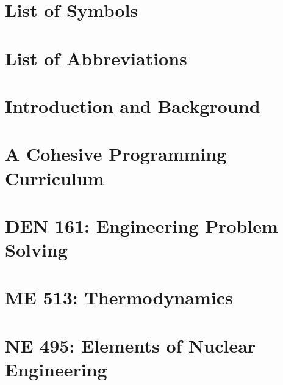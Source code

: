 \documentclass[12pt]{report}
\begin{document}
    

    
    
    


    \clearpage
    \setcounter{page}{1}
    \tableofcontents

    \clearpage
    \listoffigures


    \clearpage
    \listofassignments

    \clearpage
    \chapter*{List of Symbols}
    

    \clearpage
    \chapter*{List of Abbreviations}
    
    
    \clearpage
    \setcounter{page}{1}
    \chapter{Introduction and Background}
    

    \clearpage
    \chapter{A Cohesive Programming Curriculum}
    
    
    \clearpage
    \chapter{DEN 161: Engineering Problem Solving}
    

    \clearpage
    \chapter{ME 513: Thermodynamics}
    

    \clearpage
    \chapter{NE 495: Elements of Nuclear Engineering}
    
    
\end{document}
